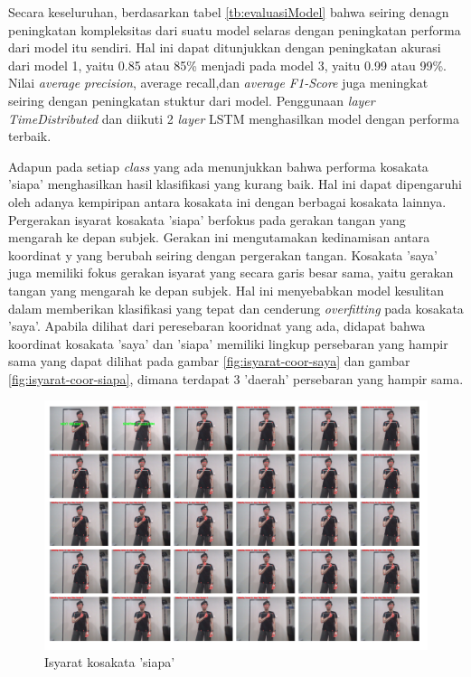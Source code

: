 Secara keseluruhan, berdasarkan tabel \ref{tb:evaluasiModel} bahwa seiring denagn peningkatan kompleksitas dari suatu model selaras dengan peningkatan performa dari model itu sendiri. Hal ini dapat ditunjukkan dengan peningkatan akurasi dari model 1, yaitu 0.85 atau 85\% menjadi pada model 3, yaitu 0.99 atau 99\%. Nilai \emph{average precision}, {average recall},dan \emph{average F1-Score} juga meningkat seiring dengan peningkatan stuktur dari model. Penggunaan \emph{layer TimeDistributed} dan diikuti 2 \emph{layer} LSTM menghasilkan model dengan performa terbaik.

Adapun pada setiap \emph{class} yang ada menunjukkan bahwa performa kosakata 'siapa' menghasilkan hasil klasifikasi yang kurang baik. Hal ini dapat dipengaruhi oleh adanya kempiripan antara kosakata ini dengan berbagai kosakata lainnya. Pergerakan isyarat kosakata 'siapa' berfokus pada gerakan tangan yang mengarah ke depan subjek. Gerakan ini mengutamakan kedinamisan antara koordinat y yang berubah seiring dengan pergerakan tangan. Kosakata 'saya' juga memiliki fokus gerakan isyarat yang secara garis besar sama, yaitu gerakan tangan yang mengarah ke depan subjek. Hal ini menyebabkan model kesulitan dalam memberikan klasifikasi yang tepat dan cenderung \emph{overfitting} pada kosakata 'saya'. Apabila dilihat dari peresebaran kooridnat yang ada, didapat bahwa koordinat kosakata 'saya' dan 'siapa' memiliki lingkup persebaran yang hampir sama yang dapat dilihat pada gambar \ref{fig:isyarat-coor-saya} dan gambar \ref{fig:isyarat-coor-siapa}, dimana terdapat 3 'daerah' persebaran yang hampir sama. 



\begin{figure}[H]
  \centering

  \includegraphics[scale=0.45]{gambar/isyarat-siapa.png}

  \caption{Isyarat kosakata 'siapa'}
  \label{fig:isyarat-siapa}
\end{figure}

